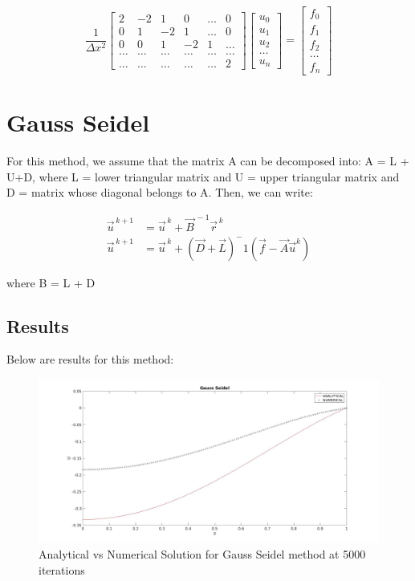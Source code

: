 \documentclass{article}
\begin{document}
\[
\dfrac{1}{\Delta x^2}\begin{bmatrix}
2&-2& 1 & 0 & \dots & 0 \\
0&1 & -2 & 1 & \dots & 0 \\
0&0 & 1 & -2 & 1 & \dots \\
\dots  & \dots  & \dots  & \dots & \dots & \dots  \\
\dots & \dots & \dots & \dots & \dots & 2
\end{bmatrix}
\begin{bmatrix}
u_0 \\ u_1 \\ u_2 \\ \dots \\ u_n 
\end{bmatrix}
=
\begin{bmatrix}
f_0 \\ f_1 \\ f_2 \\ \dots \\ f_n 
\end{bmatrix}
\]

\newpage
\section{Gauss Seidel}

For this method, we assume that the matrix A can be decomposed into: A = L + U+D, where L = lower triangular matrix and U = upper triangular matrix and D = matrix whose diagonal belongs to A. Then, we can write: 

\begin{align*}
\vec{u}^{\,k+1} &= \vec{u}^{\,k} + \vec{B}^{\,-1}\vec{r}^{\,k}\\
\vec{u}^{\,k+1} &= \vec{u}^{\,k} + (\vec{D}+\vec{L})^-1(\vec{f}-\vec{A}\vec{u}^k)
\end{align*}

\noindent
where B = L + D

\subsection{Results}

Below are results for this method: 


	\begin{figure}[H]
	\includegraphics[width=\linewidth]{GS.jpg}
	
	
	\caption{Analytical vs Numerical Solution for Gauss Seidel method at 5000 iterations}
	\end{figure}
\end{document}
